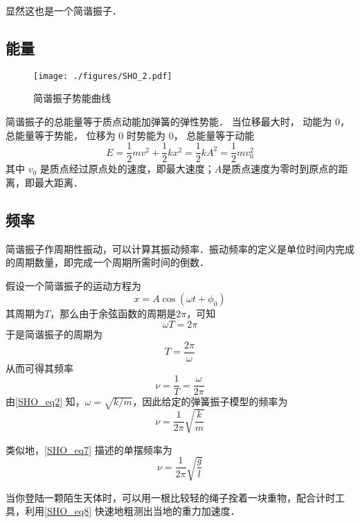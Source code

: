 显然这也是一个简谐振子．



\subsection{能量}

\begin{figure}[ht]
\centering
\texttt{[image: ./figures/SHO\_2.pdf]}
\caption{简谐振子势能曲线} \label{SHO_fig2}
\end{figure}

简谐振子的总能量等于质点动能加弹簧的弹性势能． 当位移最大时， 动能为 0， 总能量等于势能， 位移为 0 时势能为 0， 总能量等于动能
\begin{equation}
E = \frac{1}{2} mv^2 + \frac12 k x^2 = \frac12 k A^2 = \frac12 m v_0^2
\end{equation}
其中 $v_0$ 是质点经过原点处的速度，即最大速度；$A$是质点速度为零时到原点的距离，即最大距离．


\subsection{频率}

简谐振子作周期性振动，可以计算其振动频率．振动频率的定义是单位时间内完成的周期数量，即完成一个周期所需时间的倒数．

假设一个简谐振子的运动方程为
\begin{equation}
x = A\cos(\omega t+\phi_0)
\end{equation}
其周期为$T$，那么由于余弦函数的周期是$2\pi$，可知
\begin{equation}
\omega T = 2\pi
\end{equation}
于是简谐振子的周期为
\begin{equation}
T = \frac{2\pi}{\omega}
\end{equation}
从而可得其频率
\begin{equation}
\nu = \frac{1}{T} = \frac{\omega}{2\pi}
\end{equation}
由\autoref{SHO_eq2} 知，$\omega=\sqrt{k/m}$，因此给定的弹簧振子模型的频率为
\begin{equation}
\nu = \frac{1}{2\pi}\sqrt{\frac{k}{m}}
\end{equation}

类似地，\autoref{SHO_eq7} 描述的单摆频率为
\begin{equation}\label{SHO_eq8}
\nu = \frac{1}{2\pi}\sqrt{\frac{g}{l}}
\end{equation}

当你登陆一颗陌生天体时，可以用一根比较轻的绳子拴着一块重物，配合计时工具，利用\autoref{SHO_eq8} 快速地粗测出当地的重力加速度．












